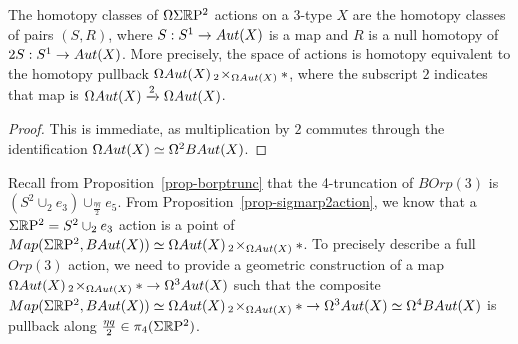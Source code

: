 \documentclass{amsart}
\begin{document}
\begin{prop} \label{prop-sigmarp2action}
The homotopy classes of $\Omega \Sigma \mathbb R \mathrm{P}^2$ actions on a 3-type $X$ are the homotopy classes of pairs $(S,R)$, where $S: S^1 \rightarrow Aut(X)$ is a map and $R$ is a null homotopy of $2S: S^1 \rightarrow Aut(X)$.  More precisely, the space of actions is homotopy equivalent to the homotopy pullback $\Omega Aut(X) \,_2\!\times_{\Omega Aut(X)} \ast$, where the subscript $2$ indicates that map is $\Omega Aut(X) \xrightarrow{2} \Omega Aut(X)$.
\end{prop}
\begin{proof}
This is immediate, as multiplication by $2$ commutes through the identification $\Omega Aut(X) \simeq \Omega^2 BAut(X)$.
\end{proof}

Recall from Proposition~\ref{prop-borptrunc} that the 4-truncation of $BOrp(3)$ is $(S^2 \cup_2 e_3) \cup_{\frac{\eta q}{2}} e_5$.  From Proposition~\ref{prop-sigmarp2action}, we know that a $\Sigma \mathbb R \mathrm{P}^2 = S^2 \cup_2 e_3$ action is a point of $Map(\Sigma \mathbb R \mathrm{P}^2,BAut(X)) \simeq \Omega Aut(X) \,_2\! \times_{\Omega Aut(X)} \ast$.  To precisely describe a full $Orp(3)$ action, we need to provide a geometric construction of a map $\Omega Aut(X) \,_2\! \times_{\Omega Aut(X)} \ast \rightarrow \Omega^3 Aut(X)$ such that the composite $Map(\Sigma \mathbb R \mathrm{P}^2,BAut(X)) \simeq \Omega Aut(X) \,_2\! \times_{\Omega Aut(X)} \ast \rightarrow \Omega^3 Aut(X) \simeq \Omega^4 BAut(X)$ is pullback along $\frac{\eta q}{2} \in \pi_4(\Sigma\mathbb R \mathrm{P}^2)$.  
\end{document}
